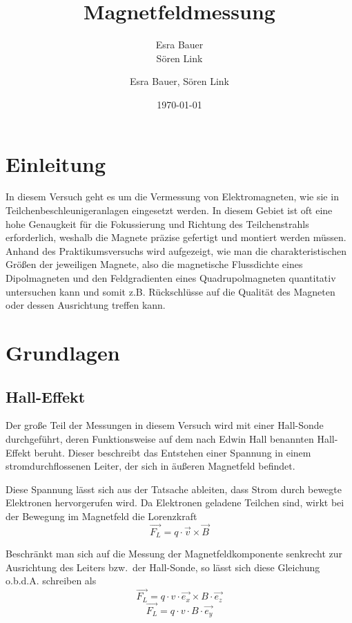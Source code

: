 \documentclass[bigchapter,colorback,accentcolor=tud4b,linedtoc,11pt]{tudreport}
\title{Magnetfeldmessung}
\subtitle{Esra Bauer  \\Sören Link}
\author{Esra Bauer, Sören Link}
\date{\today}
\begin{document}

\maketitle

\tableofcontents


\chapter{Einleitung}

In diesem Versuch geht es um die Vermessung von Elektromagneten, wie sie in Teilchenbeschleunigeranlagen eingesetzt werden. In diesem Gebiet ist oft eine hohe Genaugkeit für die Fokussierung und Richtung des Teilchenstrahls erforderlich, weshalb die Magnete präzise gefertigt und montiert werden müssen. Anhand  des Praktikumsversuchs wird aufgezeigt, wie man die charakteristischen Größen der jeweiligen Magnete, also die magnetische Flussdichte eines Dipolmagneten und den Feldgradienten eines Quadrupolmagneten quantitativ untersuchen kann und somit z.B. Rückschlüsse auf die Qualität des Magneten oder dessen Ausrichtung treffen kann.

\chapter{Grundlagen}
\section{Hall-Effekt}
Der große Teil der Messungen in diesem Versuch wird mit einer Hall-Sonde durchgeführt, deren Funktionsweise auf dem nach Edwin Hall benannten Hall-Effekt beruht. Dieser beschreibt das Entstehen einer Spannung in einem stromdurchflossenen Leiter, der sich in äußeren Magnetfeld befindet.

Diese Spannung lässt sich aus der Tatsache ableiten, dass Strom durch bewegte Elektronen hervorgerufen wird. Da Elektronen geladene Teilchen sind, wirkt bei der Bewegung im Magnetfeld die Lorenzkraft $$\vec{F_L} = q \cdot \vec{v} \times \vec{B}$$

Beschränkt man sich auf die Messung der Magnetfeldkomponente senkrecht zur Ausrichtung des Leiters bzw.\ der Hall-Sonde, so lässt sich diese Gleichung o.b.d.A. schreiben als
$$\vec{F_L} = q \cdot v \cdot \vec{e_x} \times B \cdot \vec{e_z}$$
$$\vec{F_L} = q \cdot v  \cdot B \cdot \vec{e_y}$$
\end{document}
